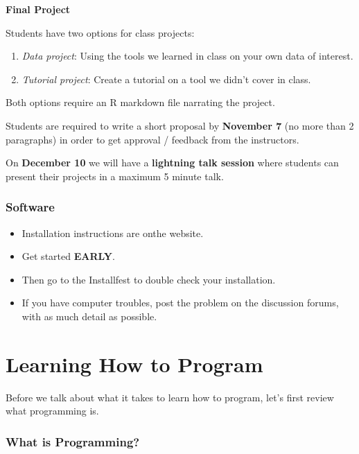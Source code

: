\documentclass[]{book}
\providecommand{\tightlist}{%
  \setlength{\itemsep}{0pt}\setlength{\parskip}{0pt}}
\begin{document}
\textbf{Final Project}

Students have two options for class projects:

\begin{enumerate}
\def\labelenumi{\arabic{enumi}.}
\item
  \emph{Data project}: Using the tools we learned in class on your own
  data of interest.
\item
  \emph{Tutorial project}: Create a tutorial on a tool we didn't cover
  in class.
\end{enumerate}

Both options require an R markdown file narrating the project.

Students are required to write a short proposal by \textbf{November 7}
(no more than 2 paragraphs) in order to get approval / feedback from the
instructors.

On \textbf{December 10} we will have a \textbf{lightning talk session}
where students can present their projects in a maximum 5 minute talk.

\subsubsection*{Software}\label{software}

\begin{itemize}
\tightlist
\item
  Installation instructions are onthe website.
\item
  Get started \textbf{EARLY}.
\item
  Then go to the Installfest to double check your installation.
\item
  If you have computer troubles, post the problem on the discussion
  forums, with as much detail as possible.
\end{itemize}

\section{Learning How to Program}\label{learning-how-to-program}

Before we talk about what it takes to learn how to program, let's first
review what programming is.

\subsubsection*{What is Programming?}\label{what-is-programming}
\end{document}
